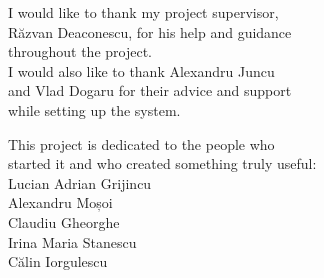 \vspace*{7cm}
\begin{center}
I would like to thank my project supervisor,\\
Răzvan Deaconescu, for his help and guidance \\
throughout the project. \\
I would also like to thank Alexandru Juncu \\
and Vlad Dogaru for their advice and support  \\
while setting up the system.
\end{center}
\vspace{0.6cm}
\begin{center}
This project is dedicated to the people who \\
started it and who created something truly useful: \\
Lucian Adrian Grijincu \\
Alexandru Moșoi \\
Claudiu Gheorghe \\
Irina Maria Stanescu \\
Călin Iorgulescu \\
\end{center}
